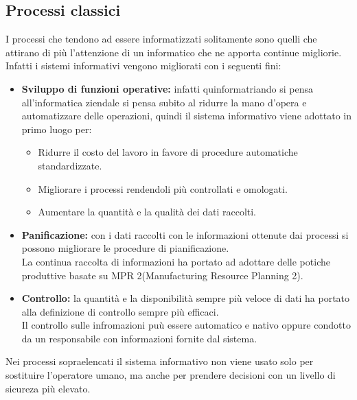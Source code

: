 \documentclass[../main.tex]{subfiles}
\begin{document}
	\subsection{Processi classici}
	I processi che tendono ad essere informatizzati solitamente sono quelli che attirano di più l'attenzione di un informatico che ne apporta continue migliorie.\\
	Infatti i sistemi informativi vengono migliorati con i seguenti fini:
	\begin{itemize}
		\item \textbf{Sviluppo di funzioni operative:} infatti quinformatriando si pensa all'informatica ziendale si pensa subito al ridurre la mano d'opera e automatizzare delle operazioni, quindi il sistema informativo viene adottato in primo luogo per:
		\begin{itemize}
			\item Ridurre il costo del lavoro in favore di procedure automatiche standardizzate.
			\item Migliorare i processi rendendoli più controllati e omologati.
			\item Aumentare la quantità e la qualità dei dati raccolti.
		\end{itemize}
		\item \textbf{Panificazione:} con i dati raccolti con le informazioni ottenute dai processi si possono migliorare le procedure di pianificazione.\\
			La continua raccolta di informazioni ha portato ad adottare delle potiche produttive basate su MPR 2(Manufacturing Resource Planning 2).
		\item \textbf{Controllo:} la quantità e la disponibilità sempre più veloce di dati ha portato alla definizione di controllo sempre più efficaci.\\
			Il controllo sulle infromazioni puù essere automatico e nativo oppure condotto da un responsabile con informazioni fornite dal sistema.
	\end{itemize}
	Nei processi sopraelencati il sistema informativo non viene usato solo per sostituire l'operatore umano, ma anche per prendere decisioni con un livello di sicureza più elevato.
\end{document}
